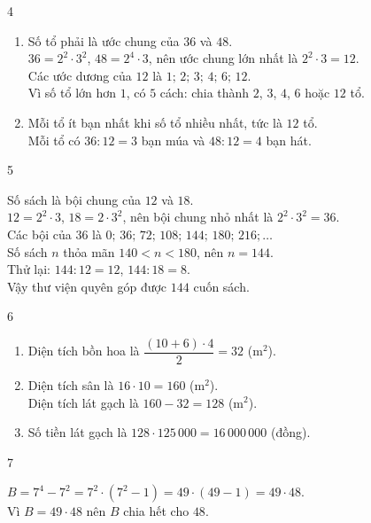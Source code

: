 \begin{Solbook}{4}
 \par \noindent  \begin {enumerate} \item Số tổ phải là ước chung của $36$ và $48$.\\ $36=2^{2}\cdot 3^{2}$, $48=2^{4}\cdot 3$, nên ước chung lớn nhất là $2^{2}\cdot 3=12$.\\ Các ước dương của $12$ là $1;\,2;\,3;\,4;\,6;\,12$.\\ Vì số tổ lớn hơn $1$, có $5$ cách: chia thành $2$, $3$, $4$, $6$ hoặc $12$ tổ. \item Mỗi tổ ít bạn nhất khi số tổ nhiều nhất, tức là $12$ tổ.\\ Mỗi tổ có $36:12=3$ bạn múa và $48:12=4$ bạn hát. \end {enumerate}  \hfill \qedEX 
\end{Solbook}
\begin{Solbook}{5}
 \par \noindent  Số sách là bội chung của $12$ và $18$.\\ $12=2^{2}\cdot 3$, $18=2\cdot 3^{2}$, nên bội chung nhỏ nhất là $2^{2}\cdot 3^{2}=36$.\\ Các bội của $36$ là $0;\,36;\,72;\,108;\,144;\,180;\,216;\ldots $\\ Số sách $n$ thỏa mãn $140<n<180$, nên $n=144$.\\ Thử lại: $144:12=12$, $144:18=8$.\\ Vậy thư viện quyên góp được $144$ cuốn sách.  \hfill \qedEX 
\end{Solbook}
\begin{Solbook}{6}
 \par \noindent  \begin {enumerate} \item Diện tích bồn hoa là $\dfrac {(10+6)\cdot 4}{2}=32$ (m$^{2}$). \item Diện tích sân là $16\cdot 10=160$ (m$^{2}$).\\ Diện tích lát gạch là $160-32=128$ (m$^{2}$). \item Số tiền lát gạch là $128\cdot 125\,000=16\,000\,000$ (đồng). \end {enumerate}  \hfill \qedEX 
\end{Solbook}
\begin{Solbook}{7}
 \par \noindent  $B=7^{4}-7^{2}=7^{2}\cdot (7^{2}-1)=49\cdot (49-1)=49\cdot 48$.\\ Vì $B=49\cdot 48$ nên $B$ chia hết cho $48$.  \hfill \qedEX 
\end{Solbook}
